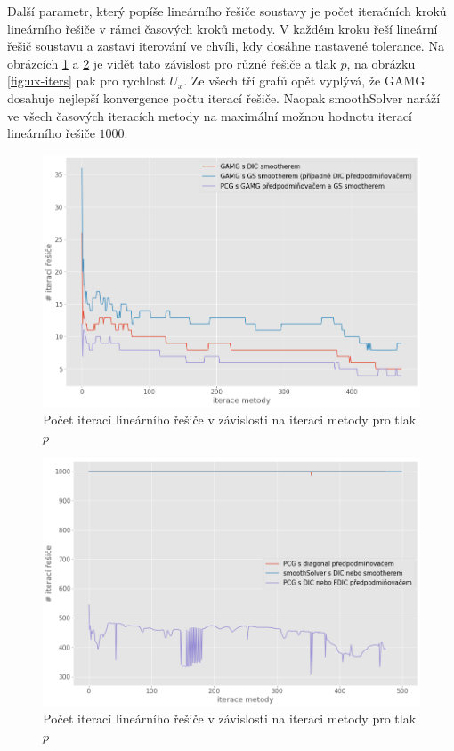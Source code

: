 \documentclass[a4paper,12pt]{report}
\theoremstyle{remark}
\begin{document}
Další parametr, který popíše  lineárního řešiče soustavy je počet iteračních kroků lineárního řešiče v rámci časových kroků metody. V každém kroku řeší lineární řešič soustavu a zastaví iterování ve chvíli, kdy dosáhne nastavené tolerance. Na obrázcích \ref{fig:p-iters-1} a \ref{fig:p-iters-2} je vidět tato závislost pro různé řešiče a tlak $p$, na obrázku \ref{fig:ux-iters} pak pro rychlost $U_x$. Ze všech tří grafů opět vyplývá, že GAMG dosahuje nejlepší konvergence počtu iterací řešiče. Naopak smoothSolver naráží ve všech časových iteracích metody na maximální možnou hodnotu iterací lineárního řešiče $1000$.
\begin{figure}[H]
	\centering
	\includegraphics[width=1\linewidth]{p-solver-iters-1.png}
	\caption{Počet iterací lineárního řešiče v závislosti na iteraci metody pro tlak $p$}
	\label{fig:p-iters-1}
\end{figure}
\begin{figure}[H]
	\centering
	\includegraphics[width=1\linewidth]{p-solver-iters-2.png}
	\caption{Počet iterací lineárního řešiče v závislosti na iteraci metody pro tlak $p$}
	\label{fig:p-iters-2}
\end{figure}
\end{document}
